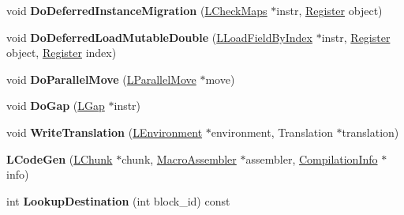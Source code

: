 \begin{DoxyCompactItemize}
\item 
void {\bfseries Do\+Deferred\+Instance\+Migration} (\hyperlink{classv8_1_1internal_1_1_l_check_maps}{L\+Check\+Maps} $\ast$instr, \hyperlink{structv8_1_1internal_1_1_register}{Register} object)\hypertarget{classv8_1_1internal_1_1_l_code_gen_a9a11a557dc4a35165efe7432b91cce0c}{}\label{classv8_1_1internal_1_1_l_code_gen_a9a11a557dc4a35165efe7432b91cce0c}

\item 
void {\bfseries Do\+Deferred\+Load\+Mutable\+Double} (\hyperlink{classv8_1_1internal_1_1_l_load_field_by_index}{L\+Load\+Field\+By\+Index} $\ast$instr, \hyperlink{structv8_1_1internal_1_1_register}{Register} object, \hyperlink{structv8_1_1internal_1_1_register}{Register} index)\hypertarget{classv8_1_1internal_1_1_l_code_gen_a61dd35347ffceb77063e647c486f62d4}{}\label{classv8_1_1internal_1_1_l_code_gen_a61dd35347ffceb77063e647c486f62d4}

\item 
void {\bfseries Do\+Parallel\+Move} (\hyperlink{classv8_1_1internal_1_1_l_parallel_move}{L\+Parallel\+Move} $\ast$move)\hypertarget{classv8_1_1internal_1_1_l_code_gen_ac76d169118f379bb8eb597ec360ca6e1}{}\label{classv8_1_1internal_1_1_l_code_gen_ac76d169118f379bb8eb597ec360ca6e1}

\item 
void {\bfseries Do\+Gap} (\hyperlink{classv8_1_1internal_1_1_l_gap}{L\+Gap} $\ast$instr)\hypertarget{classv8_1_1internal_1_1_l_code_gen_a349f26d8f5d21ea5ef25e7855317a575}{}\label{classv8_1_1internal_1_1_l_code_gen_a349f26d8f5d21ea5ef25e7855317a575}

\item 
void {\bfseries Write\+Translation} (\hyperlink{classv8_1_1internal_1_1_l_environment}{L\+Environment} $\ast$environment, Translation $\ast$translation)\hypertarget{classv8_1_1internal_1_1_l_code_gen_aa6c0dc6868c8926d71543f7d35675b7f}{}\label{classv8_1_1internal_1_1_l_code_gen_aa6c0dc6868c8926d71543f7d35675b7f}

\item 
{\bfseries L\+Code\+Gen} (\hyperlink{classv8_1_1internal_1_1_l_chunk}{L\+Chunk} $\ast$chunk, \hyperlink{classv8_1_1internal_1_1_macro_assembler}{Macro\+Assembler} $\ast$assembler, \hyperlink{classv8_1_1internal_1_1_compilation_info}{Compilation\+Info} $\ast$info)\hypertarget{classv8_1_1internal_1_1_l_code_gen_aed907f71b0a7b9401ce1c0c883ed449b}{}\label{classv8_1_1internal_1_1_l_code_gen_aed907f71b0a7b9401ce1c0c883ed449b}

\item 
int {\bfseries Lookup\+Destination} (int block\+\_\+id) const \hypertarget{classv8_1_1internal_1_1_l_code_gen_aed7b32e45855e787600f16ad151865c4}{}\label{classv8_1_1internal_1_1_l_code_gen_aed7b32e45855e787600f16ad151865c4}


\end{DoxyCompactItemize}
